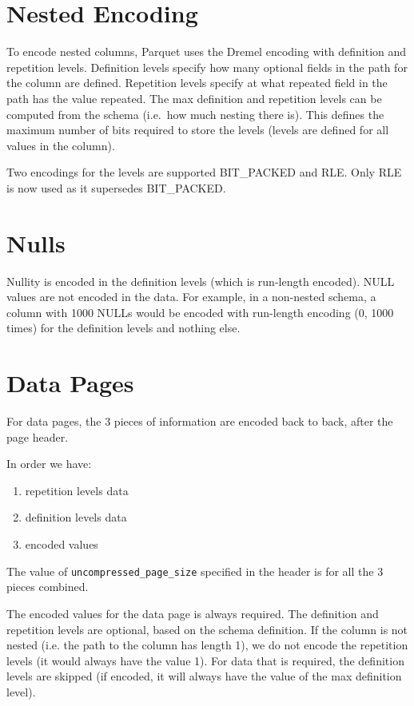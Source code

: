 \documentclass[a4paper,12pt,notitlepage,twoside,openright]{article}
\begin{document}
\hypertarget{nested-encoding}{%
\section{Nested Encoding}\label{nested-encoding}}

To encode nested columns, Parquet uses the Dremel encoding with
definition and repetition levels. Definition levels specify how many
optional fields in the path for the column are defined. Repetition
levels specify at what repeated field in the path has the value
repeated. The max definition and repetition levels can be computed from
the schema (i.e.~how much nesting there is). This defines the maximum
number of bits required to store the levels (levels are defined for all
values in the column).

Two encodings for the levels are supported BIT\_PACKED and RLE. Only RLE
is now used as it supersedes BIT\_PACKED.

\hypertarget{nulls}{%
\section{Nulls}\label{nulls}}

Nullity is encoded in the definition levels (which is run-length
encoded). NULL values are not encoded in the data. For example, in a
non-nested schema, a column with 1000 NULLs would be encoded with
run-length encoding (0, 1000 times) for the definition levels and
nothing else.

\hypertarget{data-pages}{%
\section{Data Pages}\label{data-pages}}

For data pages, the 3 pieces of information are encoded back to back,
after the page header.

In order we have:

\begin{enumerate}
\def\labelenumi{\arabic{enumi}.}

\item
  repetition levels data
\item
  definition levels data
\item
  encoded values
\end{enumerate}

The value of \texttt{uncompressed\_page\_size} specified in the header
is for all the 3 pieces combined.

The encoded values for the data page is always required. The definition
and repetition levels are optional, based on the schema definition. If
the column is not nested (i.e. the path to the column has length 1), we
do not encode the repetition levels (it would always have the value 1).
For data that is required, the definition levels are skipped (if
encoded, it will always have the value of the max definition level).
\end{document}
